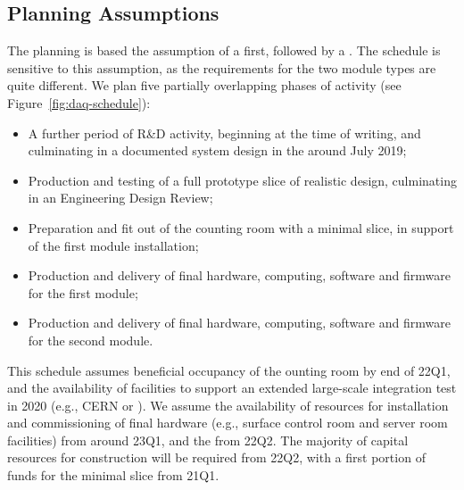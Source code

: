 \subsection{Planning Assumptions}
\label{sec:fd-daq-org-assmp}

The  planning is based the assumption of a  first, followed by a . The schedule is sensitive to this assumption, as the  requirements for the two module types are quite different. We plan five partially overlapping phases of activity (see Figure~\ref{fig:daq-schedule}):

\begin{itemize}
	\item A further period of R\&D activity, beginning at the time of writing, and culminating in a documented system design in the  around July 2019;
	\item Production and testing of a full prototype  slice of realistic design, culminating in an Engineering Design Review;
	\item Preparation and fit out of the  counting room with a minimal  slice, in support of the first module installation;
	\item Production and delivery of final hardware, computing, software and firmware for the first module;
	\item Production and delivery of final hardware, computing, software and firmware for the second module.
\end{itemize}

This schedule assumes beneficial occupancy of the  ounting room by end of 22Q1, and the availability of facilities to support an extended large-scale integration test in 2020 (e.g., CERN or \fnal). We assume the availability of resources for installation and commissioning of final  hardware (e.g., surface control room and server room facilities) from around 23Q1, and the  from 22Q2. The majority of capital resources for  construction will be required from 22Q2, with a first %
portion of funds for the minimal  slice from 21Q1.



